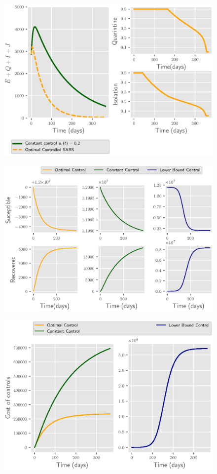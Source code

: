 \begin{figure}[htb]
  \centering
  \includegraphics{Figures/figure_1_sars}
  \caption{}
  \label{fig:figure1sars}
\end{figure}

\begin{figure}[htb]
  \centering
  \includegraphics{Figures/figure_2_sars}
  \caption{}
  \label{fig:figure2sars}
\end{figure}

\begin{figure}[htb]
  \centering
  \includegraphics{Figures/figure_3_sars}
  \caption{}
  \label{fig:figure3sars}
\end{figure}
